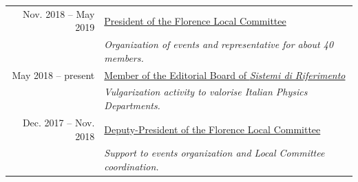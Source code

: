 \documentclass[a4, 11pt]{report}
\begin{document}
\begin{tabular*}{\textwidth}{rl}
            {\small Nov. 2018 -- May 2019} & \ul{President of the Florence Local Committee}\\
            & {\small \emph {Organization of events and representative for about 40 members.}}\\ [3mm]
                                            
            {\small May 2018 -- present} & \ul{Member of the Editorial Board of \emph{Sistemi di Riferimento}}\\
            & {\small \emph {Vulgarization activity to valorise Italian Physics Departments.}}\\ [3mm]
                                            
                                            
                                            
            {\small Dec. 2017 -- Nov. 2018} & \ul{Deputy-President of the Florence Local Committee}\\
            & {\small \emph {Support to events organization and Local Committee coordination.}}\\ [3mm]
                                            
                                            
                                            
        \end{tabular*}
    
\end{document}
